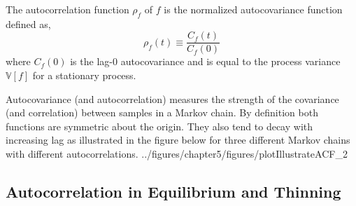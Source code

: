 The autocorrelation function $\rho_f$ of $f$ is the normalized autocovariance function defined as,
\begin{equation}
  \rho_f (t) \equiv \frac{C_f(t)}{C_f(0)}
\label{eq:ch5_autocorrelation}
\end{equation}
where $C_f(0)$ is the lag-$0$ autocovariance and is equal to the process variance $\mathbb{V}[f]$ for a stationary process.

Autocovariance (and autocorrelation) measures the strength of the covariance (and correlation) between samples in a Markov chain.
By definition both functions are symmetric about the origin.
They also tend to decay with increasing lag as illustrated in the figure below for three different Markov chains with different autocorrelations.
{../figures/chapter5/figures/plotIllustrateACF_2}

\clearpage

\subsection[Autocorrelation in Equilibrium and Thinning]{Autocorrelation in Equilibrium and Thinning}\label{sub:bc_mcmc_thinning}

